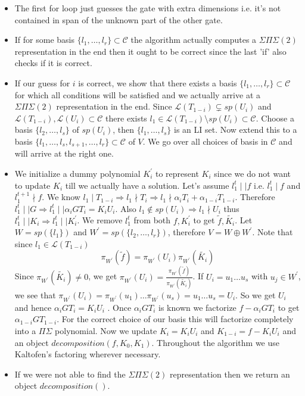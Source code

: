 \documentclass[letterpaper,USenglish,numberwithinsect]{lipics}
\newcommand{\ML}{\mathcal{L}}
\newcommand{\MC}{\mathcal{C}}
\begin{document}
\begin{itemize}
\item The first for loop just guesses the gate with extra dimensions i.e. it's not contained in
span of the unknown part of the other gate.
\item If for some basis $\{l_1,\ldots,l_r\}\subset \MC$ the algorithm actually computes a
$\Sigma\Pi\Sigma(2)$ representation in the end then
it ought to be correct since the last 'if' also checks if it is correct.
 \item If our guess for $i$ is correct, we show that there exists a basis
$\{l_1,\ldots,l_r\} \subset \MC$ for which all conditions will be
 satisfied and we actually arrive at a $\Sigma\Pi\Sigma(2)$ representation in
the end. Since $\ML(T_{1-i})\subsetneq sp(U_i)$ and $\ML(T_{1-i}),\ML(U_i)\subset \MC$ there exists
$l_1\in \ML(T_{1-i})\setminus sp(U_i)\subset \MC$. Choose a basis $\{l_2,\ldots,l_s\}$ of $sp(U_i)$, then $\{l_1,\ldots,l_s\}$ is an LI set.
Now extend this to a basis $\{l_1,\ldots,l_s,l_{s+1},\ldots,l_r\}\subset \MC$ of $V$.  We go over all choices of basis
in $\MC$ and will arrive at the right one.

\item We initialize a dummy polynomial $K_i^\prime$ to represent
$K_i$ since we do not want to update $K_i$ till we actually have a solution.
Let's assume $l_1 ^t \mid\mid f$ i.e. $l_1^t\mid f$ and $l_1^{t+1}\nmid f$. We know $l_1\mid T_{1-i}\Rightarrow l_1\nmid T_i
\Rightarrow l_1\nmid \alpha_iT_i + \alpha_{1-i}T_{1-i}$. Therefore
$l_1^t\mid\mid G \Rightarrow l_1^t\mid\mid \alpha_iGT_i = K_iU_i$. Also $l_1
\notin sp(U_i) \Rightarrow l_1\nmid U_i$ thus $l_1^t \mid\mid K_i \Rightarrow l_1^t\mid\mid K_i^\prime$. We remove
$l_1^t$ from both $f,K_i^\prime$ to get $\tilde{f}, \tilde{K_i}$. Let $W = sp(\{l_1\})$ and $W^\prime =
sp(\{l_2,\ldots,l_r\})$, therefore $V = W\oplus W^\prime$.
 Note that since $l_1\in \ML(T_{1-i})$
 \[
 \pi_{W^\prime}(\tilde{f}) = \pi_{W^\prime}(U_i)\pi_{W^\prime}(\tilde{K_i})
  \]
  Since $\pi_{W^\prime}(\tilde{K_i})\neq 0$, we  get
$\pi_{W^\prime}(U_i)=\frac{\pi_{W^\prime}(\tilde{f})}{\pi_{W^\prime}(\tilde{K_i})}$.
  If $U_i = u_1\ldots u_s$ with $u_j\in W^\prime$, we see that $\pi_{W^\prime}(U_i) =
\pi_{W^\prime}(u_1)\ldots \pi_{W^\prime}(u_s) = u_1\ldots u_s = U_i$.
  So we get $U_i$ and hence $\alpha_iGT_i =K_iU_i$ . Once $\alpha_iGT_i$ is
known we factorize $f-\alpha_i GT_i$ to get $\alpha_{1-i} GT_{1-i}$. For the correct choice of our basis this will
factorize completely into a $\Pi\Sigma$ polynomial. Now we update $K_i = K_iU_i$ and $K_{1-i}=f-K_iU_i$ and an object $decomposition(f,K_0,K_1)$. Throughout
the algorithm we use Kaltofen's factoring \cite{KalTr90} wherever necessary.
\item If we were not able to find the $\Sigma\Pi\Sigma(2)$ representation then we return an object $decomposition()$.
\end{itemize}
\end{document}

